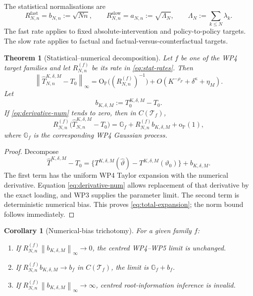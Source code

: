 \documentclass[11pt]{article}
\newtheorem{theorem}[assumption]{Theorem}
\newtheorem{corollary}[assumption]{Corollary}
\theoremstyle{remark}
\newcommand{\Pp}{\mathbb P}
\newcommand{\cT}{\mathcal T}
\newcommand{\norm}[1]{\left\lVert #1\right\rVert}
\newcommand{\op}{\mathrm{o}_{\Pp}}
\newcommand{\Op}{\mathrm{O}_{\Pp}}
\newcommand{\an}{a_{N,n}}
\newcommand{\bn}{b_{N,n}}
\newcommand{\LamN}{\Lambda_N}
\begin{document}
The statistical normalisations are
\begin{equation}\label{eq:stat-rates}
 R_{N,n}^{\mathrm{fast}}=\bn:=\sqrt{Nn},
 \qquad
 R_{N,n}^{\mathrm{slow}}=\an:=\sqrt{\LamN},
 \qquad
 \LamN:=\sum_{k\le N}\lambda_k.
\end{equation}
The fast rate applies to fixed absolute-intervention and policy-to-policy targets. The slow rate applies to factual and factual-versus-counterfactual targets.

\begin{theorem}[Statistical--numerical decomposition]\label{thm:total}
Let $f$ be one of the WP4 target families and let $R_{N,n}^{(f)}$ be its rate in \eqref{eq:stat-rates}. Then
\begin{equation}\label{eq:total-bound}
 \norm{\widehat T_{N,n}^{K,\delta,M}-T_0}_\infty
 =\Op\big((R_{N,n}^{(f)})^{-1}\big)
 +O\left(K^{-\rho_F}+\delta^\kappa+\eta_M\right).
\end{equation}
Let
\begin{equation}\label{eq:bias-surface}
 b_{K,\delta,M}:=T_0^{K,\delta,M}-T_0.
\end{equation}
If \eqref{eq:derivative-num} tends to zero, then in $C(\cT_f)$,
\begin{equation}\label{eq:total-expansion}
 R_{N,n}^{(f)}
 \big(\widehat T_{N,n}^{K,\delta,M}-T_0\big)
 =\mathbb G_f
 +R_{N,n}^{(f)}b_{K,\delta,M}
 +\op(1),
\end{equation}
where $\mathbb G_f$ is the corresponding WP4 Gaussian process.
\end{theorem}

\begin{proof}
Decompose
\[
 \widehat T^{K,\delta,M}-T_0
 =\{T^{K,\delta,M}(\widehat\vartheta)-T^{K,\delta,M}(\vartheta_0)\}
 +b_{K,\delta,M}.
\]
The first term has the uniform WP4 Taylor expansion with the numerical derivative. Equation \eqref{eq:derivative-num} allows replacement of that derivative by the exact loading, and WP3 supplies the parameter limit. The second term is deterministic numerical bias. This proves \eqref{eq:total-expansion}; the norm bound follows immediately.
\end{proof}

\begin{corollary}[Numerical-bias trichotomy]\label{cor:trichotomy}
For a given family $f$:
\begin{enumerate}[label=(\roman*)]
 \item If $R_{N,n}^{(f)}\norm{b_{K,\delta,M}}_\infty\to0$, the centred WP4--WP5 limit is unchanged.
 \item If $R_{N,n}^{(f)}b_{K,\delta,M}\to b_f$ in $C(\cT_f)$, the limit is $\mathbb G_f+b_f$.
 \item If $R_{N,n}^{(f)}\norm{b_{K,\delta,M}}_\infty\to\infty$, centred root-information inference is invalid.
\end{enumerate}
\end{corollary}
\end{document}
